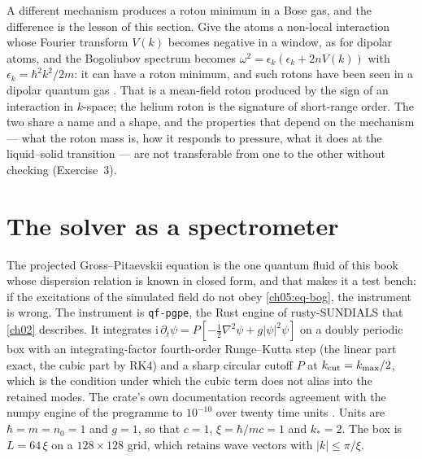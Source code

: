 A different mechanism produces a roton minimum in a Bose gas, and the difference is the lesson of this section.
Give the atoms a non-local interaction whose Fourier transform $V(k)$ becomes negative in a window, as for dipolar atoms, and the Bogoliubov spectrum becomes $\omega^2=\epsilon_k(\epsilon_k+2nV(k))$ with $\epsilon_k=\hbar^2k^2/2m$: it can have a roton minimum, and such rotons have been seen in a dipolar quantum gas \cite{Santos2003,Chomaz2018}.
That is a mean-field roton produced by the sign of an interaction in $k$-space; the helium roton is the signature of short-range order.
The two share a name and a shape, and the properties that depend on the mechanism --- what the roton mass is, how it responds to pressure, what it does at the liquid--solid transition --- are not transferable from one to the other without checking (Exercise~3).


\section{The solver as a spectrometer}\label{ch05:sec-solver}

The projected Gross--Pitaevskii equation is the one quantum fluid of this book whose dispersion relation is known in closed form, and that makes it a test bench: if the excitations of the simulated field do not obey \cref{ch05:eq-bog}, the instrument is wrong.
The instrument is \texttt{qf-pgpe}, the Rust engine of rusty-SUNDIALS that \cref{ch02} describes.
It integrates $\mathrm i\,\partial_t\psi=P[-\tfrac12\nabla^2\psi+g|\psi|^2\psi]$ on a doubly periodic box with an integrating-factor fourth-order Runge--Kutta step (the linear part exact, the cubic part by RK4) and a sharp circular cutoff $P$ at $k_{\rm cut}=k_{\max}/2$, which is the condition under which the cubic term does not alias into the retained modes.
The crate's own documentation records agreement with the numpy engine of the programme to $10^{-10}$ over twenty time units \cite{Callens2026sw}.
Units are $\hbar=m=n_0=1$ and $g=1$, so that $c=1$, $\xi=\hbar/mc=1$ and $k_\ast=2$.
The box is $L=64\,\xi$ on a $128\times128$ grid, which retains  wave vectors with $|k|\le\pi/\xi$.

